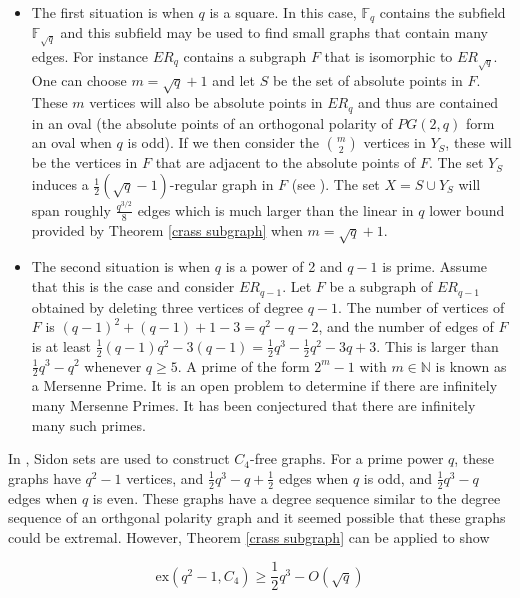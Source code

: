 \documentclass[12pt]{article}
\begin{document}
\begin{itemize}
    \item The first situation is when $q$ is a square.  In this case, $\mathbb{F}_{q}$ contains the subfield $\mathbb{F}_{\sqrt{q}}$ and this subfield may be used to find small graphs that contain many edges.  For instance $ER_{q}$ contains a subgraph $F$ that is isomorphic to $ER_{ \sqrt{q} }$.
          One can choose $m = \sqrt{q} + 1$ and let $S$ be the set of absolute points in $F$.  These $m$ vertices will also be absolute points in $ER_q$ and thus are contained in an oval (the absolute points of an orthogonal polarity of $PG(2,q)$ form an oval when $q$ is odd).  If we then consider the $\binom{m}{2}$ vertices in $Y_S$, these will be the vertices in $F$ that are adjacent to the absolute points of $F$.  The set $Y_S$ induces a $\frac{1}{2}(\sqrt{q} -1)$-regular graph in $F$ (see \cite{bachraty2014polarity}).
          The set $X = S \cup Y_S$ will span roughly $\frac{q^{3/2}}{8}$ edges which is much larger than the linear in $q$ lower bound provided by Theorem \ref{crass subgraph} when $m  = \sqrt{q} + 1$.

    \item The second situation is when $q$ is a power of 2 and $q  - 1$ is prime.
          Assume that this is the case and consider $ER_{q-1}$.  Let $F$ be a subgraph of
          $ER_{q-1}$ obtained by deleting three vertices of degree $q-1$.  The number of vertices of $F$ is
          $(q - 1)^2 + (q - 1) + 1 - 3 = q^2 - q - 2$, and the number of edges of $F$ is at least
          $\frac{1}{2} (q - 1) q^2 - 3(q  - 1)  = \frac{1}{2}q^3 - \frac{1}{2}q^2 - 3q + 3$.  This is larger than $\frac{1}{2}q^3 - q^2$ whenever $q \geq 5$.  A prime of the form $2^m-1$ with $m \in \mathbb{N}$ is known as a Mersenne Prime.  It is an open problem to determine if there are infinitely many Mersenne Primes.  It has been conjectured that there are infinitely many such primes.
\end{itemize}


In \cite{tait2013sidon}, Sidon sets are used to construct $C_4$-free graphs.  For a prime power $q$, these graphs have $q^2-1$ vertices, and $\frac{1}{2}q^3 - q + \frac{1}{2}$ edges when $q$ is odd, and $\frac{1}{2}q^3 - q$ edges when $q$ is even.  These graphs have a degree sequence similar to the degree sequence of an orthgonal polarity graph and it seemed possible that these graphs could be extremal.  However, Theorem \ref{crass subgraph} can be applied to show

$$ \mathrm{ex}(q^2-1, C_4) \geq \frac{1}{2}q^3 - O(\sqrt{q}) $$
\end{document}
